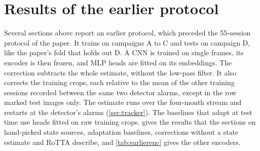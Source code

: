 \documentclass[10pt,twocolumn,letterpaper]{article}
\begin{document}
\section{Results of the earlier protocol}
\label{sec:earlier}
Several sections above report an earlier protocol, which preceded the 55-session protocol of the paper. It trains on campaigns A to C and tests on campaign D, like the paper's fold that holds out D. A CNN is trained on single frames, its encoder is then frozen, and MLP heads are fitted on its embeddings. The correction subtracts the whole estimate, without the low-pass filter. It also corrects the training crops, each relative to the mean of the other training sessions recorded between the same two detector alarms, except in the row marked test images only. The estimate runs over the four-month stream and restarts at the detector's alarms (\cref{sec:tracker}). The baselines that adapt at test time use heads fitted on raw training crops.  gives the results that the sections on hand-picked state sources, adaptation baselines, corrections without a state estimate and RoTTA describe, and \cref{tab:earlierenc} gives the other encoders.
\end{document}
